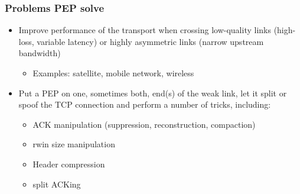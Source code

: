 \begin{frame}
  \frametitle{Problems PEP solve}
  \begin{itemize}
    \item Improve performance of the transport when crossing low-quality links (high-loss, variable latency) or highly asymmetric links (narrow upstream bandwidth)
    \begin{itemize}
      \item Examples: satellite, mobile network, wireless
    \end{itemize}
    \item Put a PEP on one, sometimes both, end(s) of the weak link, let it split or spoof the TCP connection and perform a number of tricks, including:
    \begin{itemize}
      \item ACK manipulation (suppression, reconstruction, compaction)
      \item rwin size manipulation
      \item Header compression
      \item split ACKing
    \end{itemize}
  \end{itemize}
\end{frame}

